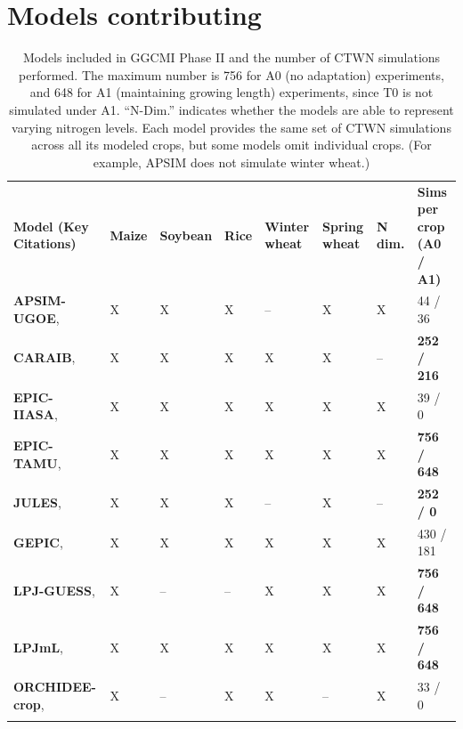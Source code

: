 \documentclass[gmd, manuscript]{copernicus} %
\begin{document}
\section{Models contributing}
\label{S:3}
\begin{table}[t]
\caption{
Models included in GGCMI Phase II and the number of CTWN simulations performed. 
The maximum number is 756 for A0 (no adaptation) experiments, and 648 for A1 (maintaining growing length) experiments, since T0 is not simulated under A1. ``N-Dim.'' indicates whether the models are able to represent varying nitrogen levels.
Each model provides the same set of CTWN simulations across all its modeled crops, but some models omit individual crops. (For example, APSIM does not simulate winter wheat.)
}
\label{table:models}
  \begin{tabular}{p{6cm} p{1cm} p{1cm} p{1cm} p{1cm} p{1cm} p{1cm} p{1.9cm}}
        \tophline
    {\textbf{Model (Key Citations)}}&{\textbf{Maize}}&{\textbf{Soybean}}&{\textbf{Rice}}&{\textbf{Winter wheat}}&{\textbf{Spring wheat}}&{\textbf{N dim.}}&{\textbf{Sims per crop (A0 / A1)}}\\ \middlehline
        {\textbf{APSIM-UGOE},   \citet{KEATING2003267, HOLZWORTH2014327}} & {X} & {X} & {X} & {--} & {X} & {X} & {44 / 36}\\ \middlehline
        {\textbf{CARAIB},       \citet{Dury2011, Pirttioja2015}}  & {X} & {X} & {X} & {X} & {X} & {--} & {\textbf{252 / 216}}\\ \middlehline
        {\textbf{EPIC-IIASA},   \citet{BALKOVIC2014}} & {X} & {X} & {X} & {X} & {X} & {X} & {39 / 0}\\  \middlehline
        {\textbf{EPIC-TAMU},    \citet{Izaurralde06}} & {X} & {X} & {X} & {X} & {X} & {X} & {\textbf{756 / 648}}\\ \middlehline
        {\textbf{JULES},        \citet{Osborne2015, Williams2015, Williams2017}} & {X} & {X} & {X} & {--} & {X} & {--} & {\textbf{252 / 0}}\\ \middlehline
        {\textbf{GEPIC},        \citet{LIU2007478, FOLBERTH201221}} & {X} & {X} & {X} & {X} & {X} & {X} & {430 / 181}\\ \middlehline
        {\textbf{LPJ-GUESS},    \citet{Lindeskog2013, Olin2015}} & {X} & {--} & {--} & {X} & {X} & {X} & {\textbf{756 / 648}}\\  \middlehline
        {\textbf{LPJmL},        \citet{von_Bloh_implementing_2018}} & {X} & {X} & {X} & {X} & {X} & {X} & {\textbf{756 / 648}}\\ \middlehline
        {\textbf{ORCHIDEE-crop},\citet{Wu2016}} & {X} & {--}  & {X} & {X} & {--} & {X} & {33 / 0}\\ \middlehline

\end{tabular}
\end{table}
\end{document}
